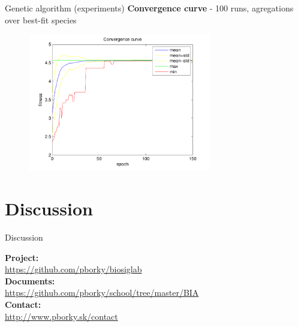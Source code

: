 \documentclass{beamer}
\begin{document}
\begin{frame}{Genetic algorithm (experiments)}
	\centering
	\textbf{Convergence curve} - 100 runs, agregations over best-fit species
	\begin{figure}[h] %
		\includegraphics[width=80mm]{ga_conv_curve}
		\label{ga_conv_curve}
	\end{figure}
\end{frame}

\section{Discussion}
\begin{frame}{Discussion}
	\begin{center}
	
		\textbf{Project:}\\\url{https://github.com/pborky/biosiglab}\\
		\textbf{Documents:}\\ \url{https://github.com/pborky/school/tree/master/BIA}\\
		\textbf{Contact:}\\\url{http://www.pborky.sk/contact}\\
	
	\end{center}
\end{frame}
\end{document}
